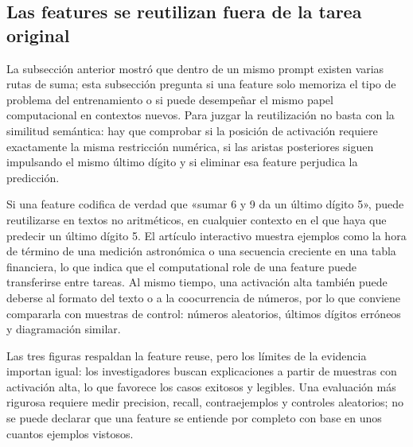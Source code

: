 \subsection{Las features se reutilizan fuera de la tarea original}

La subsección anterior mostró que dentro de un mismo prompt existen varias rutas de suma; esta subsección pregunta si una feature solo memoriza el tipo de problema del entrenamiento o si puede desempeñar el mismo papel computacional en contextos nuevos. Para juzgar la reutilización no basta con la similitud semántica: hay que comprobar si la posición de activación requiere exactamente la misma restricción numérica, si las aristas posteriores siguen impulsando el mismo último dígito y si eliminar esa feature perjudica la predicción.

Si una feature codifica de verdad que «sumar 6 y 9 da un último dígito 5», puede reutilizarse en textos no aritméticos, en cualquier contexto en el que haya que predecir un último dígito 5. El artículo interactivo muestra ejemplos como la hora de término de una medición astronómica o una secuencia creciente en una tabla financiera, lo que indica que el computational role de una feature puede transferirse entre tareas. Al mismo tiempo, una activación alta también puede deberse al formato del texto o a la coocurrencia de números, por lo que conviene compararla con muestras de control: números aleatorios, últimos dígitos erróneos y diagramación similar.




Las tres figuras respaldan la feature reuse, pero los límites de la evidencia importan igual: los investigadores buscan explicaciones a partir de muestras con activación alta, lo que favorece los casos exitosos y legibles. Una evaluación más rigurosa requiere medir precision, recall, contraejemplos y controles aleatorios; no se puede declarar que una feature se entiende por completo con base en unos cuantos ejemplos vistosos.

